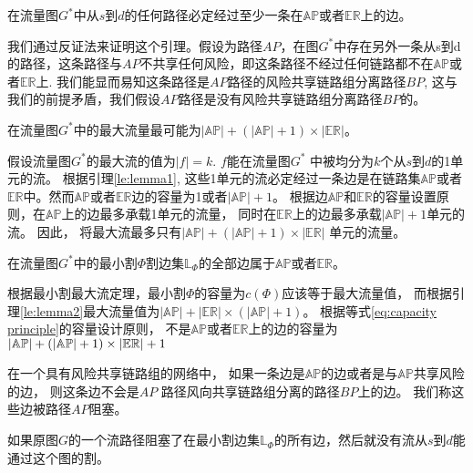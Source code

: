 \begin{lem}
\label{le:lemma1}
  在流量图$G^*$中从$s$到$d$的任何路径必定经过至少一条在$\mathbb{AP}$或者$\mathbb{ER}$上的边。
\end{lem}
\begin{pro}
  我们通过反证法来证明这个引理。假设为路径$AP$，在图$G^*$中存在另外一条从s到d的路径，这条路径与$AP$不共享任何风险，即这条路径不经过任何链路都不在$\mathbb{AP}$或者$\mathbb{ER}$上. 我们能显而易知这条路径是$AP$路径的风险共享链路组分离路径$BP$, 这与我们的前提矛盾，我们假设$AP$路径是没有风险共享链路组分离路径$BP$的。
\end{pro}

\begin{lem}
\label{le:lemma2}
  在流量图$G^*$中的最大流量最可能为$|\mathbb{AP}|+(|\mathbb{AP}|+1)\times|\mathbb{\mathbb{ER}}|$。
\end{lem}
\begin{pro}
  假设流量图$G^*$的最大流的值为$|f|=k$. $f$能在流量图$G^*$ 中被均分为$k$个从$s$到$d$的1单元的流。 根据引理\ref{le:lemma1}, 这些1单元的流必定经过一条边是在链路集$\mathbb{AP}$或者$\mathbb{ER}$中。然而$\mathbb{AP}$或者$\mathbb{ER}$边的容量为1或者$|\mathbb{AP}|+1$。 根据边$\mathbb{AP}$和$\mathbb{ER}$的容量设置原则，在$\mathbb{AP}$上的边最多承载1单元的流量， 同时在$\mathbb{ER}$上的边最多承载$|\mathbb{AP}|+1$单元的流。 因此， 将最大流最多只有$|\mathbb{AP}|+(|\mathbb{AP}|+1)\times|\mathbb{\mathbb{ER}}|$ 单元的流量。
\end{pro}

\begin{lem}
\label{le:lemma3}
  在流量图$G^*$中的最小割$\Phi$割边集$\mathbb{L}_{\Phi}$的全部边属于$\mathbb{AP}$或者$\mathbb{ER}$。
\end{lem}
\begin{pro}
  根据最小割最大流定理，最小割$\Phi$的容量为$c(\Phi)$应该等于最大流量值， 而根据引理\ref{le:lemma2}最大流量值为$|\mathbb{AP}|+ |\mathbb{ER}|\times (|\mathbb{AP}|+1)$。 根据等式\ref{eq:capacity principle}的容量设计原则， 不是$\mathbb{AP}$或者$\mathbb{ER}$上的边的容量为$\left| {{\rm\mathbb{AP}}} \right| + \left( {\left| {{\rm\mathbb{AP}}} \right| + 1} \right)\times \left| {{\rm{\mathbb{E}}}{{\rm{\mathbb{R}}}}} \right| + 1$
\end{pro}

在一个具有风险共享链路组的网络中， 如果一条边是$\mathbb{AP}$的边或者是与$\mathbb{AP}$共享风险的边， 则这条边不会是$AP$ 路径风向共享链路组分离的路径$BP$上的边。 我们称这些边被路径$AP$阻塞。

\begin{thm}
如果原图$G$的一个流路径阻塞了在最小割边集$\mathbb{L}_{\Phi}$的所有边，然后就没有流从$s$到$d$能通过这个图的割。
\label{th:block flow}
\end{thm}

